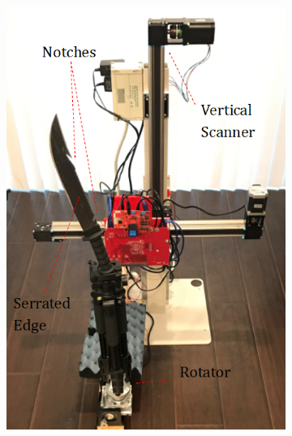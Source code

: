 \documentclass[conference]{IEEEtran}
\begin{document}
		\begin{figure} [h]
			\begin{subfigure}{.5\linewidth}
				\centering
				\includegraphics[width=1\linewidth]{../Figures/Scanner Photos/RSAR Scanner}
				\caption{}
				\label{fig:scanner}
			\end{subfigure}%
			\begin{subfigure}{.5\linewidth}
				\centering

\end{subfigure}
\end{figure}
\end{document}
